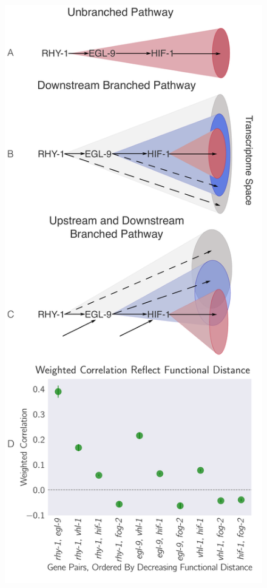 \documentclass[9pt,twocolumn,twoside]{pnas-new}
\begin{document}
\begin{figure}[tbhp]
\centering
\includegraphics[width=\linewidth]{figs/decorrelation.pdf}

\end{figure}
\end{document}
